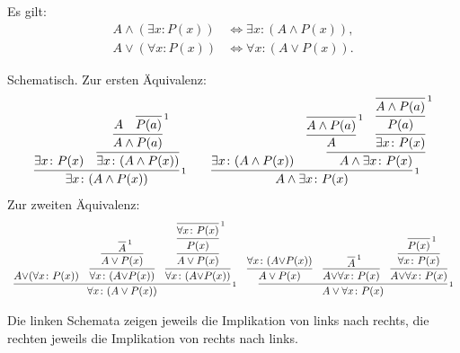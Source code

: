 \begin{Satz}%
\label{general-dl}
Es gilt:
\begin{align}
A\land (\exists x\colon P(x)) &\iff \exists x\colon (A\land P(x)),\\
A\lor (\forall x\colon P(x)) &\iff \forall x\colon (A\lor P(x)).
\end{align}
\end{Satz}
\begin{Beweis}
Schematisch. Zur ersten Äquivalenz:
\[\begin{array}{c@{\qquad}c}
\infer[\infernote{1}]{\exists x\colon (A\land P(x))}{
  \exists x\colon P(x)
  & \infer{\exists x\colon (A\land P(x))}{
      \infer{A\land P(a)}{A & \infer[\infernote{1}]{P(a)}{}}}
}
&
\infer[\infernote{1}]{A\land\exists x\colon P(x)}{
\exists x\colon (A\land P(x))
& \infer{A\land \exists x\colon P(x)}{
    \infer{A}{\infer[\infernote{1}]{A\land P(a)}{}}
  & \infer{\exists x\colon P(x)}{
      \infer{P(a)}{\infer[\infernote{1}]{A\land P(a)}{}}}
}
}
\end{array}\]
Zur zweiten Äquivalenz:
{\small
\[\begin{array}{c@{\quad}c}
\infer[\infernote{1}]{\forall x\colon (A\lor P(x))}{
A{\lor}(\forall x\colon P(x))
& \infer{\forall x\colon (A{\lor}P(x))}{
    \infer{A\lor P(x)}{\infer[\infernote{1}]{A}{}}
  }
& \infer{\forall x\colon (A{\lor}P(x))}{
    \infer{A\lor P(x)}{
      \infer{P(x)}{\infer[\infernote{1}]{\forall x\colon P(x)}{}}
    }
  }
}
&
\infer[\infernote{1}]{A\lor\forall x\colon P(x)}{
  \infer{A\lor P(x)}{\forall x\colon (A{\lor}P(x))}
  & \infer{A{\lor}\forall x\colon P(x)}{
      \infer[\infernote{1}]{A}{}}
  & \infer{A{\lor}\forall x\colon P(x)}{
      \infer{\forall x\colon P(x)}{
        \infer[\infernote{1}]{P(x)}{}}}
}
\end{array}\]
}

\noindent
Die linken Schemata zeigen jeweils die Implikation von links nach
rechts, die rechten jeweils die Implikation von rechts nach
links.\,\qedsymbol
\end{Beweis}

